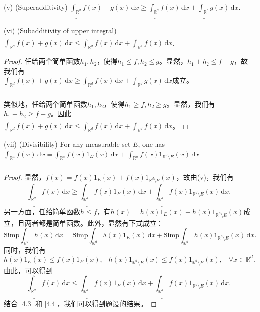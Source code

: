 \documentclass[reqno,a4paper,10pt]{amsart}
\newcommand\dif{\,\mathrm{d}}
\newcommand\Rnum{\mathbb{R}}
\begin{document}
(v) (Superadditivity) $\underline{\int_{\Rnum^d}}f(x)+g(x)\dif x\geq \underline{\int_{\Rnum^d}}f(x)\dif x+\underline{\int_{\Rnum^d}}g(x)\dif x$.

(vi) (Subadditivity of upper integral) $\overline{\int_{\Rnum^d}}f(x)+g(x)\dif x\leq \overline{\int_{\Rnum^d}}f(x)\dif x+\overline{\int_{\Rnum^d}}f(x)\dif x$.
\begin{proof}
    任给两个简单函数$h_1,h_2$，使得$h_1\leq f,h_2\leq g$。显然，$h_1+h_2\leq f+g$，故我们有\\
    $\underline{\int_{\Rnum^d}}f(x)+g(x)\dif x\geq \underline{\int_{\Rnum^d}}f(x)\dif x+\underline{\int_{\Rnum^d}}g(x)\dif x$成立。
    
    类似地，任给两个简单函数$h_1,h_2$，使得$h_1\geq f,h_2\geq g$。显然，我们有$h_1+h_2\geq f+g$。因此\\
    $\overline{\int_{\Rnum^d}}f(x)+g(x)\dif x\leq \overline{\int_{\Rnum^d}}f(x)\dif x+\overline{\int_{\Rnum^d}}f(x)\dif x$。
\end{proof}
(vii) (Divisibility) For any measurable set $E$, one has $\underline{\int_{\Rnum^d}}f(x)\dif x =\underline{\int_{\Rnum^d}}f(x)1_{E}(x)\dif x+\underline{\int_{\Rnum^d}}f(x)1_{\Rnum^d\setminus E}(x)\dif x$.
\begin{proof}
    显然，$f(x)=f(x)1_{E}(x)+f(x)1_{\Rnum^d\setminus E}(x)$，故由(v)，我们有
    \begin{equation}
        \underline{\int_{\Rnum^d}}f(x)\dif x \geq \underline{\int_{\Rnum^d}}f(x)1_{E}(x)\dif x+\underline{\int_{\Rnum^d}}f(x)1_{\Rnum^d\setminus E}(x)\dif x.
        \label{4.3}
    \end{equation}
    另一方面，任给简单函数$h\leq f$，有$h(x)=h(x)1_{E}(x)+h(x)1_{\Rnum^d\setminus E}(x)$成立，且两者都是简单函数。此外，显然有下式成立：
    \begin{equation*}
        \mathrm{Simp}\int_{\Rnum^d} h(x)\dif x=\mathrm{Simp}\int_{\Rnum^d} h(x)1_{E}(x)\dif x+\mathrm{Simp}\int_{\Rnum^d} h(x)1_{\Rnum^d\setminus E}(x)\dif x.
    \end{equation*}
    同时，我们有
    \begin{equation*}
        h(x)1_{E}(x)\leq f(x)1_{E}(x),\;\;\; h(x)1_{\Rnum^d\setminus E}(x)\leq f(x)1_{\Rnum^d\setminus E}(x),\;\;\;\forall x\in\Rnum^d.
    \end{equation*}
    由此，可以得到
    \begin{equation}
        \underline{\int_{\Rnum^d}}f(x)\dif x \leq \underline{\int_{\Rnum^d}}f(x)1_{E}(x)\dif x+\underline{\int_{\Rnum^d}}f(x)1_{\Rnum^d\setminus E}(x)\dif x.
        \label{4.4}
    \end{equation}
    结合 \eqref{4.3} 和 \eqref{4.4}，我们可以得到题设的结果。
\end{proof}
\end{document}
